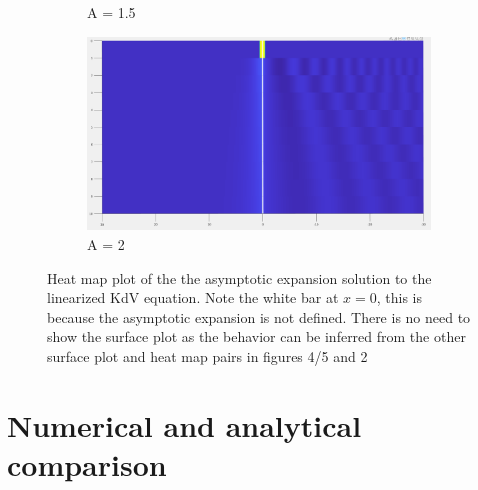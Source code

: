 \documentclass{article}
\begin{document}
\begin{figure}[H]
\begin{subfigure}[b]{85mm}
\caption{A = 1.5}
\label{fig:}
\end{subfigure}
\begin{subfigure}[b]{85mm}
\includegraphics[scale=0.14]{figures/asym2H.png}
\caption{A = 2}
\label{fig:}
\end{subfigure}


\caption{Heat map plot of the the asymptotic expansion solution to the linearized KdV equation. Note the white bar at $x=0$, this is because the asymptotic expansion is not defined. There is no need to show the surface plot as the behavior can be inferred from the other surface plot and heat map pairs in figures 4/5 and 2}
\label{fig:}
\end{figure}

\section{Numerical and analytical comparison}
\end{document}
